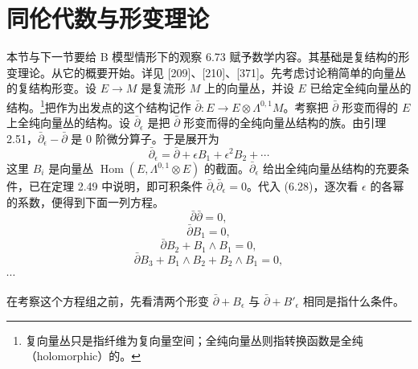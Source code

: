 
\section{同伦代数与形变理论}


本节与下一节要给 B 模型情形下的观察 6.73 赋予数学内容。其基础是复结构的形变理论。从它的概要开始。详见 [209]、[210]、[371]。先考虑讨论稍简单的向量丛的复结构形变。设 $E\to M$ 是复流形 $M$ 上的向量丛，并设 $E$ 已给定全纯向量丛的结构。\footnote{复向量丛只是指纤维为复向量空间；全纯向量丛则指转换函数是全纯（holomorphic）的。}把作为出发点的这个结构记作 $\bar\partial\colon E\to E\otimes\Lambda^{0,1}M$。考察把 $\bar\partial$ 形变而得的 $E$ 上全纯向量丛的结构。设 $\bar\partial_\epsilon$ 是把 $\bar\partial$ 形变而得的全纯向量丛结构的族。由引理 2.51，$\bar\partial_\epsilon-\bar\partial$ 是 0 阶微分算子。于是展开为
\begin{equation}
  \bar\partial_\epsilon=\bar\partial+\epsilon B_1+\epsilon^2B_2+\cdots \tag{6.28}
\end{equation}
这里 $B_i$ 是向量丛 $\operatorname{Hom}(E,\Lambda^{0,1}\otimes E)$ 的截面。$\bar\partial_\epsilon$ 给出全纯向量丛结构的充要条件，已在定理 2.49 中说明，即可积条件 $\bar\partial_\epsilon\bar\partial_\epsilon=0$。代入 (6.28)，逐次看 $\epsilon$ 的各幂的系数，便得到下面一列方程。
\begin{equation}
  \bar\partial\bar\partial=0, \tag{6.29}
\end{equation}
\begin{equation}
  \bar\partial B_1=0, \tag{6.30}
\end{equation}
\begin{equation}
  \bar\partial B_2+B_1\wedge B_1=0, \tag{6.31}
\end{equation}
\begin{equation}
  \bar\partial B_3+B_1\wedge B_2+B_2\wedge B_1=0, \tag{6.32}
\end{equation}
$\cdots$

在考察这个方程组之前，先看清两个形变 $\bar\partial+B_\epsilon$ 与 $\bar\partial+B'_\epsilon$ 相同是指什么条件。

